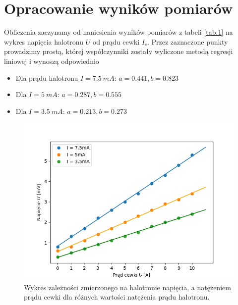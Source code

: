 \documentclass{article}
\begin{document}
\section{Opracowanie wyników pomiarów}

Obliczenia zaczynamy od naniesienia wyników pomiarów z tabeli
\ref{tab:1} na wykres napięcia halotronu $U$ od prądu cewki $I_c$.
Przez zaznaczone punkty prowadzimy prostą, której współczynniki
zostały wyliczone metodą regresji liniowej i wynoszą odpowiednio
\begin{itemize}
    \item Dla prądu halotronu $I = \SI{7.5}{mA}$: $a = 0.441, b = 0.823$
    \item Dla $I = \SI{5}{mA}$: $a = 0.287, b = 0.555$
    \item Dla $I = \SI{3.5}{mA}$: $a = 0.213, b = 0.273$
\end{itemize}
\begin{figure}[h]
    \centering
    \includegraphics[scale=0.75]{cw43/wykres1.png}
    \caption{Wykres zależności zmierzonego na halotronie napięcia, a
    natężeniem prądu cewki dla różnych wartości natężenia prądu halotronu.}
    \label{fig:fig1}
\end{figure}
\end{document}
